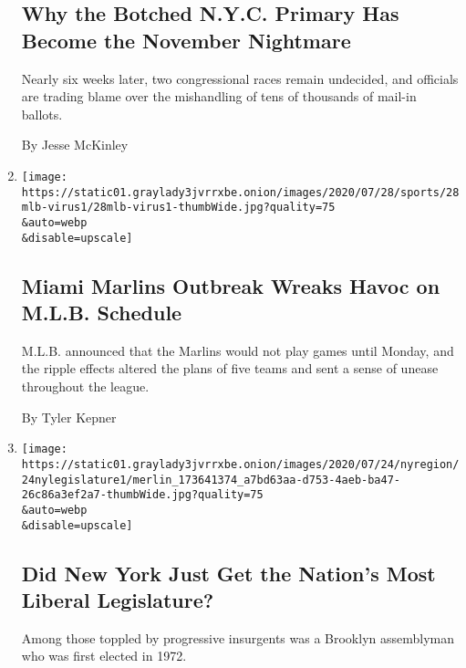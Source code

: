 \begin{enumerate}
  \hypertarget{why-the-botched-nyc-primary-has-become-the-november-nightmare}{%
  \subsection{Why the Botched N.Y.C. Primary Has Become the November
  Nightmare}\label{why-the-botched-nyc-primary-has-become-the-november-nightmare}}

  Nearly six weeks later, two congressional races remain undecided, and
  officials are trading blame over the mishandling of tens of thousands
  of mail-in ballots.

  By Jesse McKinley
\item
  \href{/2020/07/28/sports/baseball/marlins-outbreak-mlb-coronavirus.html}{}

  \texttt{[image: https://static01.graylady3jvrrxbe.onion/images/2020/07/28/sports/28mlb-virus1/28mlb-virus1-thumbWide.jpg?quality=75\\\&auto=webp\\\&disable=upscale]}

  \hypertarget{miami-marlins-outbreak-wreaks-havoc-on-mlb-schedule}{%
  \subsection{Miami Marlins Outbreak Wreaks Havoc on M.L.B.
  Schedule}\label{miami-marlins-outbreak-wreaks-havoc-on-mlb-schedule}}

  M.L.B. announced that the Marlins would not play games until Monday,
  and the ripple effects altered the plans of five teams and sent a
  sense of unease throughout the league.

  By Tyler Kepner
\item
  \href{/2020/07/24/nyregion/progressive-primaries-ny-legislature.html}{}

  \texttt{[image: https://static01.graylady3jvrrxbe.onion/images/2020/07/24/nyregion/24nylegislature1/merlin\_173641374\_a7bd63aa-d753-4aeb-ba47-26c86a3ef2a7-thumbWide.jpg?quality=75\\\&auto=webp\\\&disable=upscale]}

  \hypertarget{did-new-york-just-get-the-nations-most-liberal-legislature}{%
  \subsection{Did New York Just Get the Nation's Most Liberal
  Legislature?}\label{did-new-york-just-get-the-nations-most-liberal-legislature}}

  Among those toppled by progressive insurgents was a Brooklyn
  assemblyman who was first elected in 1972.


\end{enumerate}

